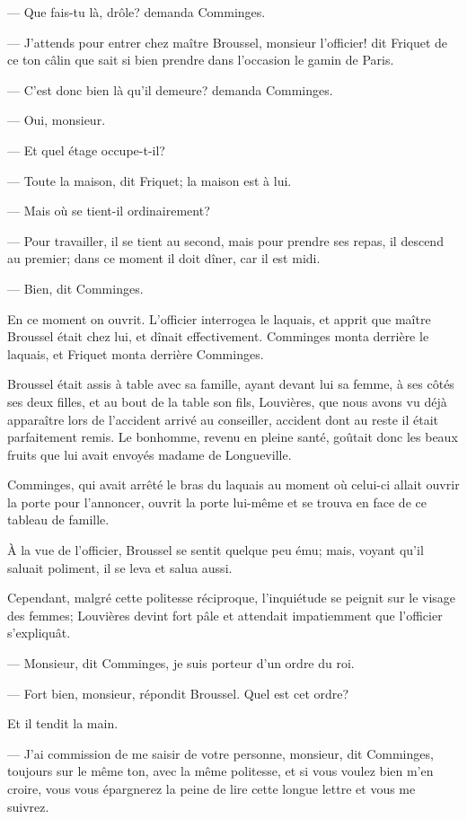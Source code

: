— Que fais-tu là, drôle? demanda Comminges.

— J'attends pour entrer chez maître Broussel, monsieur l'officier! dit Friquet de ce ton câlin que sait si bien prendre dans l'occasion le gamin de Paris.

— C'est donc bien là qu'il demeure? demanda Comminges.

— Oui, monsieur.

— Et quel étage occupe-t-il?

— Toute la maison, dit Friquet; la maison est à lui.

— Mais où se tient-il ordinairement?

— Pour travailler, il se tient au second, mais pour prendre ses repas, il descend au premier; dans ce moment il doit dîner, car il est midi.

— Bien, dit Comminges.

En ce moment on ouvrit. L'officier interrogea le laquais, et apprit que maître Broussel était chez lui, et dînait effectivement. Comminges monta derrière le laquais, et Friquet monta derrière Comminges.

Broussel était assis à table avec sa famille, ayant devant lui sa femme, à ses côtés ses deux filles, et au bout de la table son fils, Louvières, que nous avons vu déjà apparaître lors de l'accident arrivé au conseiller, accident dont au reste il était parfaitement remis. Le bonhomme, revenu en pleine santé, goûtait donc les beaux fruits que lui avait envoyés madame de Longueville.

Comminges, qui avait arrêté le bras du laquais au moment où celui-ci allait ouvrir la porte pour l'annoncer, ouvrit la porte lui-même et se trouva en face de ce tableau de famille.

À la vue de l'officier, Broussel se sentit quelque peu ému; mais, voyant qu'il saluait poliment, il se leva et salua aussi.

Cependant, malgré cette politesse réciproque, l'inquiétude se peignit sur le visage des femmes; Louvières devint fort pâle et attendait impatiemment que l'officier s'expliquât.

— Monsieur, dit Comminges, je suis porteur d'un ordre du roi.

— Fort bien, monsieur, répondit Broussel. Quel est cet ordre?

Et il tendit la main.

— J'ai commission de me saisir de votre personne, monsieur, dit Comminges, toujours sur le même ton, avec la même politesse, et si vous voulez bien m'en croire, vous vous épargnerez la peine de lire cette longue lettre et vous me suivrez.

